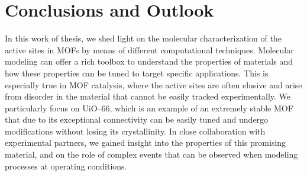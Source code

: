 \graphicspath{{figures/}}
\renewcommand\evenpagerightmark{{\scshape\small Conclusions and perspectives}} 
\renewcommand\oddpageleftmark{{\scshape\small Chapter 4}}


\hyphenation{}

\chapter[Conclusions and perspectives]%
{Conclusions and Outlook}
\label{ch4}
In this work of thesis, we shed light on the molecular characterization of the active sites in MOFs by means of different computational techniques. Molecular modeling can offer a rich toolbox to understand the properties of materials and how these properties can be tuned to target specific applications. This is especially true in MOF catalysis, where the active sites are often elusive and arise from disorder in the material that cannot be easily tracked experimentally. We particularly focus on UiO--66, which is an example of an extremely stable MOF that due to its exceptional connectivity can be easily tuned and undergo modifications without losing its crystallinity. In close collaboration with experimental partners, we gained insight into the properties of this promising material, and on the role of complex events that can be observed when modeling processes at operating conditions.
\npar
